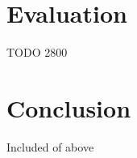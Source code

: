 \documentclass[12pt,a4paper,twoside,openright]{report}
\begin{document}
\chapter{Evaluation}

TODO 2800


\chapter{Conclusion}

Included of above


{}

\begin{comment}
\appendix


\chapter{Project Proposal}
\end{comment}
\end{document}
